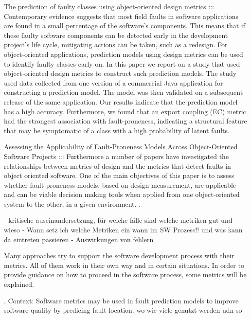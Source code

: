 The prediction of faulty classes using object-oriented design metrics ::: \cite{b10el2001prediction} Contemporary evidence suggests that most field faults in software applications are found in a small percentage of the software's components. This means that if these faulty software components can be detected early in the development project's life cycle, mitigating actions can be taken, such as a redesign. For object-oriented applications, prediction models using design metrics can be used to identify faulty classes early on. In this paper we report on a study that used object-oriented design metrics to construct such prediction models. The study used data collected from one version of a commercial Java application for constructing a prediction model. The model was then validated on a subsequent release of the same application. Our results indicate that the prediction model has a high accuracy. Furthermore, we found that an export coupling (EC) metric had the strongest association with fault-proneness, indicating a structural feature that may be symptomatic of a class with a high probability of latent faults.


Assessing the Applicability of Fault-Proneness Models Across Object-Oriented Software Projects ::: Furthermore a number of papers have investigated the relationships between metrics of design and the metrics that detect faults in object oriented software. One of the main objectives of this paper is to assess whether fault-proneness models, based on design measurement, are applicable and can be viable decision making tools when applied from one object-oriented system to the other, in a given environment. \cite{b12riand2002assessing}.



- kritische auseinandersetzung, für welche fälle sind welche metriken gut und wieso
- Wann setz ich welche Metriken ein wann im SW Prozess!! und was kann da eintreten passieren
- Auswirkungen von fehlern

Many approaches try to support the software development process with their metrics. All of them work in their own way and in certain situations. 
In order to provide guidance on how to proceed in the software process, some metrics will be explained.

\cite{b7radjenovic2013software}. Context: Software metrics may be used in fault prediction models to improve software quality by predicing fault location. wo wie viele genutzt werden udn so